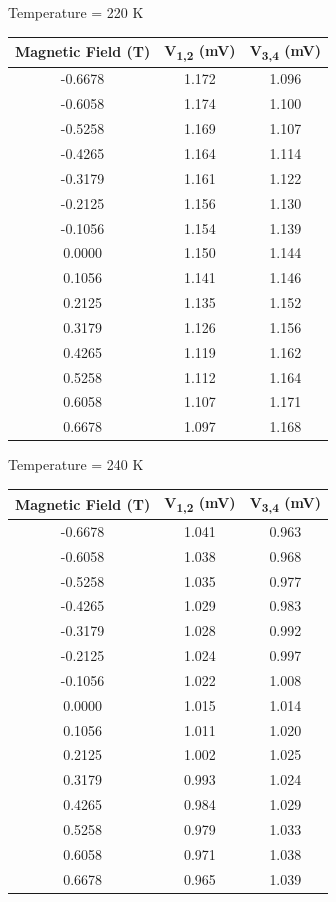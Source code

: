 \documentclass[twocolumn]{article}
\begin{document}
\begin{minipage}{\linewidth}
\Centering
Temperature = 220 K
\begin{tabular}{|c|c|c|}
\hline
Magnetic Field (T) & V\textsubscript{1,2} (mV) & V\textsubscript{3,4} (mV) \\ \hline
-0.6678 & 1.172 & 1.096 \\ \hline
-0.6058 & 1.174 & 1.100 \\ \hline
-0.5258 & 1.169 & 1.107 \\ \hline
-0.4265 & 1.164 & 1.114 \\ \hline
-0.3179 & 1.161 & 1.122 \\ \hline
-0.2125 & 1.156 & 1.130 \\ \hline
-0.1056 & 1.154 & 1.139 \\ \hline
0.0000 & 1.150 & 1.144 \\ \hline
0.1056 & 1.141 & 1.146 \\ \hline
0.2125 & 1.135 & 1.152 \\ \hline
0.3179 & 1.126 & 1.156 \\ \hline
0.4265 & 1.119 & 1.162 \\ \hline
0.5258 & 1.112 & 1.164 \\ \hline
0.6058 & 1.107 & 1.171 \\ \hline
0.6678 & 1.097 & 1.168 \\ \hline
\end{tabular}
\end{minipage}
\begin{minipage}{\linewidth}
\Centering
Temperature = 240 K
\begin{tabular}{|c|c|c|}
\hline
Magnetic Field (T) & V\textsubscript{1,2} (mV) & V\textsubscript{3,4} (mV) \\ \hline
-0.6678 & 1.041 & 0.963 \\ \hline
-0.6058 & 1.038 & 0.968 \\ \hline
-0.5258 & 1.035 & 0.977 \\ \hline
-0.4265 & 1.029 & 0.983 \\ \hline
-0.3179 & 1.028 & 0.992 \\ \hline
-0.2125 & 1.024 & 0.997 \\ \hline
-0.1056 & 1.022 & 1.008 \\ \hline
0.0000 & 1.015 & 1.014 \\ \hline
0.1056 & 1.011 & 1.020 \\ \hline
0.2125 & 1.002 & 1.025 \\ \hline
0.3179 & 0.993 & 1.024 \\ \hline
0.4265 & 0.984 & 1.029 \\ \hline
0.5258 & 0.979 & 1.033 \\ \hline
0.6058 & 0.971 & 1.038 \\ \hline
0.6678 & 0.965 & 1.039 \\ \hline
\end{tabular}
\end{minipage}
\end{document}
